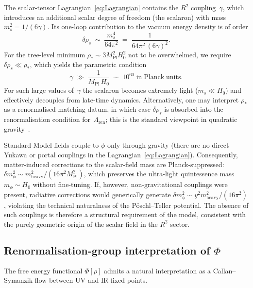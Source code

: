 \documentclass[12pt,a4paper]{article}
\theoremstyle{definition}
\theoremstyle{plain}
\theoremstyle{remark}
\begin{document}
The scalar-tensor Lagrangian~\eqref{eq:Lagrangian} contains
the $R^2$ coupling~$\gamma$, which introduces an additional scalar
degree of freedom (the scalaron) with mass
$m_s^2 = 1/(6\gamma)$.  Its one-loop contribution to
the vacuum energy density is of order
\begin{equation}\label{eq:delta-rho-scalaron}
  \delta\rho_s
  \;\sim\; \frac{m_s^4}{64\pi^2}
  \;=\; \frac{1}{64\pi^2\,(6\gamma)^2}.
\end{equation}
For the tree-level minimum $\rho_\ast \sim 3M_{\mathrm{Pl}}^2 H_0^2$
not to be overwhelmed, we require $\delta\rho_s \ll \rho_\ast$, which
yields the parametric condition
\begin{equation}\label{eq:gamma-bound}
  \gamma \;\gg\; \frac{1}{M_{\mathrm{Pl}}\,H_0}
  \;\sim\; 10^{60}\;\mathrm{in\;Planck\;units}.
\end{equation}
For such large values of~$\gamma$ the scalaron becomes extremely
light ($m_s \ll H_0$) and effectively decouples from late-time
dynamics.  Alternatively, one may interpret $\rho_\ast$ as a
renormalised matching datum, in which case $\delta\rho_s$ is
absorbed into the renormalisation condition
for~$\Lambda_{\mathrm{ren}}$; this is the standard viewpoint in
quadratic gravity~\cite{SotiriouFaraoni2010}.

Standard Model fields couple to $\phi$ only through gravity (there are
no direct Yukawa or portal couplings in the
Lagrangian~\eqref{eq:Lagrangian}).  Consequently, matter-induced
corrections to the scalar-field mass are Planck-suppressed:
$\delta m_\phi^2 \sim m_{\mathrm{heavy}}^2/(16\pi^2 M_{\mathrm{Pl}}^2)$,
which preserves the ultra-light quintessence mass $m_\phi \sim H_0$
without fine-tuning.  If, however, non-gravitational couplings were
present, radiative corrections would generically generate
$\delta m_\phi^2 \sim y^2 m_{\mathrm{heavy}}^2/(16\pi^2)$, violating
the technical naturalness of the P\"oschl--Teller potential.  The
absence of such couplings is therefore a structural requirement of the
model, consistent with the purely geometric origin of the scalar
field in the $R^2$ sector.

\subsection{Renormalisation-group interpretation of $\Phi$}
\label{sec:rg-interpretation}

The free energy functional $\Phi[\rho]$ admits a natural interpretation
as a Callan--Symanzik flow between UV and IR fixed points.
\end{document}
